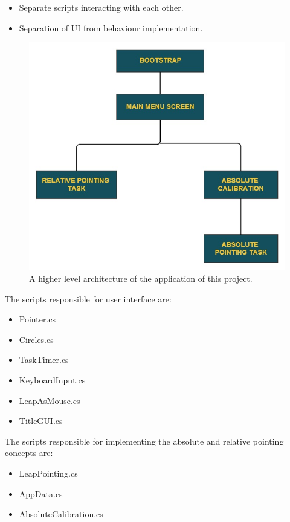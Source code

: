 \documentclass[titlepage]{article}
\begin{document}
\begin{itemize}
  \item Separate scripts interacting with each other.
  \item Separation of UI from behaviour implementation.
\end{itemize}

\begin{figure}[!h]
\centering
\includegraphics[width=4.5in]{Figure_6}
\caption{A higher level architecture of the application of this project.}
\end{figure}

The scripts responsible for user interface are:

\begin{itemize}
    \item Pointer.cs
    \item Circles.cs
    \item TaskTimer.cs
    \item KeyboardInput.cs
    \item LeapAsMouse.cs
    \item TitleGUI.cs
\end{itemize}

The scripts responsible for implementing the absolute and relative pointing concepts are:

\begin{itemize}
    \item LeapPointing.cs
    \item AppData.cs
    \item AbsoluteCalibration.cs

\end{itemize}
\end{document}
